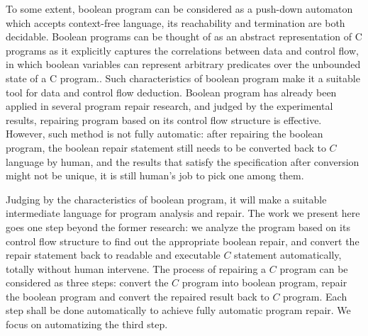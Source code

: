 To some extent, boolean program can be considered as a push-down automaton which accepts context-free language, its reachability and termination are both decidable\cite{CFLaPDA}.
Boolean programs can be thought of as an abstract representation of C programs as it explicitly captures the correlations between data and control flow, in which boolean variables can represent arbitrary predicates over the unbounded state of a C program.\cite{APAoCP}.
Such characteristics of boolean program make it a suitable tool for data and control flow deduction.
Boolean program has already been applied in several program repair research\cite{RoBPwaAtC}, and judged by the experimental results, repairing program based on its control flow structure is effective.
However, such method is not fully automatic: after repairing the boolean program, the boolean repair statement still needs to be converted back to $C$ language by human, and the results that satisfy the specification after conversion might not be unique, it is still human's job to pick one among them.

Judging by the characteristics of boolean program, it will make a suitable intermediate language for program analysis and repair.
The work we present here goes one step beyond the former research: we analyze the program based on its control flow structure to find out the appropriate boolean repair, and convert the repair statement back to readable and executable $C$ statement automatically, totally without human intervene.
The process of repairing a $C$ program can be considered as three steps: convert the $C$ program into boolean program, repair the boolean program and convert the repaired result back to $C$ program. Each step shall be done automatically to achieve fully automatic program repair.
We focus on automatizing the third step.

